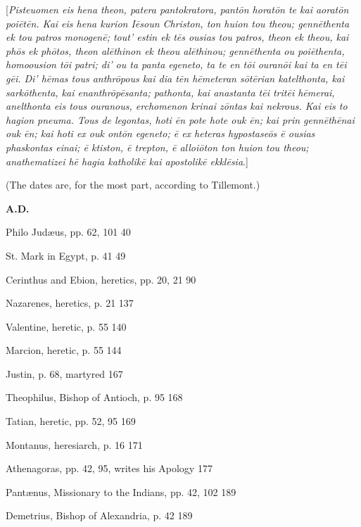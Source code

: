 
[\emph{Pisteuomen eis hena theon, patera pantokratora, pant\={o}n
horat\={o}n te kai aorat\={o}n poi\={e}t\={e}n. Kai eis hena kurion I\={e}soun Christon, ton huion tou theou;
genn\={e}thenta ek tou patros monogen\={e}; tout' estin ek t\={e}s
ousias tou patros, theon ek theou, kai ph\={o}s ek ph\={o}tos,
theon al\={e}thinon ek theou al\={e}thinou; genn\={e}thenta
ou poi\={e}thenta, homoousion t\={o}i patri; di' ou ta panta
egeneto, ta te en t\={o}i ouran\={o}i kai ta en t\={e}i g\={e}i.
Di' h\={e}mas tous anthr\={o}pous kai dia t\={e}n h\={e}meteran
s\={o}t\={e}rian katelthonta, kai sark\={o}thenta, kai
enanthr\={o}p\={e}santa; pathonta, kai anastanta t\={e}i trit\={e}i
h\={e}merai, anelthonta eis tous ouranous, erchomenon krinai z\={o}ntas
kai nekrous. Kai eis to hagion pneuma. Tous de legontas, hoti \={e}n pote hote ouk \={e}n; kai prin
genn\={e}th\={e}nai ouk \={e}n; kai hoti ex ouk ont\={o}n
egeneto; \={e} ex heteras hypostase\={o}s \={e} ousias
phaskontas einai; \={e} ktiston, \={e} trepton, \={e} alloi\={o}ton
ton huion tou theou; anathematizei h\={e} hagia katholik\={e}
kai apostolik\={e} ekkl\={e}sia}.]



(The dates are, for the most part, according to
Tillemont.)

\textbf{A.D.}

Philo Judæus, pp. 62, 101
40

St. Mark in Egypt, p. 41
49

Cerinthus and Ebion, heretics, pp. 20, 21
90

Nazarenes, heretics, p. 21
137

Valentine, heretic, p. 55
140

Marcion, heretic, p. 55
144

Justin, p. 68, martyred
167

Theophilus, Bishop of Antioch, p. 95
168

Tatian, heretic, pp. 52, 95
169

Montanus, heresiarch, p. 16
171

Athenagoras, pp. 42, 95, writes his Apology
177

Pantænus, Missionary to the Indians, pp. 42,
102
189

Demetrius, Bishop of Alexandria, p. 42
189

